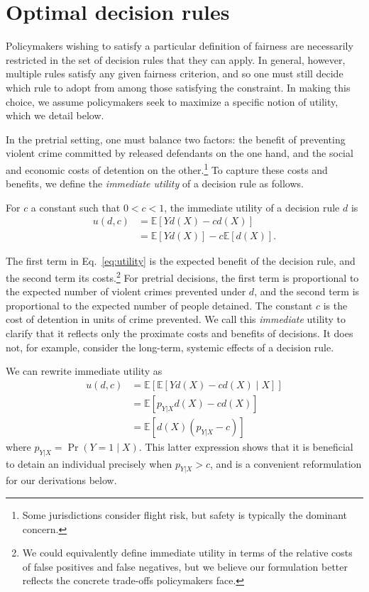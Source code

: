 \documentclass[sigconf]{acmart}
\newcommand{\EE}{\mathbb{E}}
\begin{document}
\section{Optimal decision rules}
Policymakers wishing to satisfy a particular definition of fairness are necessarily restricted in the set of decision rules that they can apply. 
In general, however, multiple rules satisfy any given fairness criterion, 
and so one must still decide which rule 
to adopt from among those satisfying the constraint.
In making this choice, we assume policymakers seek to maximize 
a specific notion of utility, which we detail below.

In the pretrial setting, one must balance two factors: 
the benefit of preventing violent crime committed by released defendants on the one hand,
and the social and economic costs of detention on the other.\footnote{Some jurisdictions consider flight risk, but safety is typically the dominant concern.} 
To capture these costs and benefits, we define the \emph{immediate utility} of a decision rule as follows.

\begin{definition}
For $c$ a constant such that $0 < c < 1$,
the immediate utility of a decision rule $d$ is
\begin{align}
u(d, c) & = \EE \left [ Yd(X) - cd(X) \right ] \nonumber \\
& = \EE \left [ Yd(X) \right ] - c\EE \left [ d(X) \right ]. \label{eq:utility}
\end{align}
\end{definition}

The first term in Eq.~\eqref{eq:utility}
is the expected benefit of the decision rule, and the second term its costs.\footnote{%
We could equivalently define immediate utility in terms of the relative costs 
of false positives and false negatives, but we believe our formulation
 better reflects the concrete trade-offs policymakers face.
}
For pretrial decisions, the first term is proportional to the expected number of violent crimes prevented under $d$,
and the second term is proportional to the expected number of people detained.
The constant $c$ is the cost of detention in units of crime prevented.
We call this \emph{immediate} utility to clarify that it reflects only the proximate 
costs and benefits of decisions. It does not, for example, consider the long-term,
systemic effects of a decision rule.

 We can rewrite immediate utility as
 \begin{align}
 u(d, c) & = \EE \left [ \EE \left [ Yd(X) - cd(X) \mid X \right ] \right ] \nonumber \\
 & = \EE \left [ p_{Y|X} d(X) - cd(X) \right ] \nonumber \\
 & = \EE \left [ d(X) (p_{Y|X} - c) \right ] \label{eq:utility2}
 \end{align}
 where $p_{Y|X} = \Pr(Y = 1 \mid X)$.
This latter expression shows that it is beneficial to detain an individual precisely when $p_{Y|X} > c$, and is a convenient reformulation for our derivations below.
\end{document}
